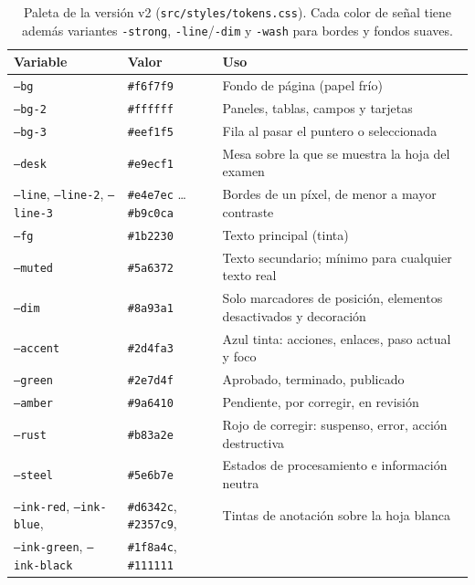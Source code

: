 \begin{table}[htbp]
  \centering
  \small
  \begin{tabular}{llp{}}
    \toprule
    \textbf{Variable} & \textbf{Valor} & \textbf{Uso} \\
    \midrule
    \texttt{--bg} & \texttt{\#f6f7f9} & Fondo de página (papel frío) \\
    \texttt{--bg-2} & \texttt{\#ffffff} & Paneles, tablas, campos y tarjetas \\
    \texttt{--bg-3} & \texttt{\#eef1f5} & Fila al pasar el puntero o seleccionada \\
    \texttt{--desk} & \texttt{\#e9ecf1} & Mesa sobre la que se muestra la hoja del examen \\
    \texttt{--line}, \texttt{--line-2}, \texttt{--line-3} & \texttt{\#e4e7ec} \dots{} \texttt{\#b9c0ca} &
      Bordes de un píxel, de menor a mayor contraste \\
    \texttt{--fg} & \texttt{\#1b2230} & Texto principal (tinta) \\
    \texttt{--muted} & \texttt{\#5a6372} & Texto secundario; mínimo para cualquier texto real \\
    \texttt{--dim} & \texttt{\#8a93a1} & Solo marcadores de posición, elementos
      desactivados y decoración \\
    \midrule
    \texttt{--accent} & \texttt{\#2d4fa3} & Azul tinta: acciones, enlaces, paso actual y foco \\
    \texttt{--green} & \texttt{\#2e7d4f} & Aprobado, terminado, publicado \\
    \texttt{--amber} & \texttt{\#9a6410} & Pendiente, por corregir, en revisión \\
    \texttt{--rust} & \texttt{\#b83a2e} & Rojo de corregir: suspenso, error, acción destructiva \\
    \texttt{--steel} & \texttt{\#5e6b7e} & Estados de procesamiento e información neutra \\
    \midrule
    \texttt{--ink-red}, \texttt{--ink-blue}, & \texttt{\#d6342c}, \texttt{\#2357c9}, &
      Tintas de anotación sobre la hoja blanca \\
    \texttt{--ink-green}, \texttt{--ink-black} & \texttt{\#1f8a4c}, \texttt{\#111111} & \\
    \bottomrule
  \end{tabular}
  \caption{Paleta de la versión v2 (\texttt{src/styles/tokens.css}). Cada color de
    señal tiene además variantes \texttt{-strong}, \texttt{-line}/\texttt{-dim} y
    \texttt{-wash} para bordes y fondos suaves.\label{TAB:STYLE-COLOURS}}
\end{table}

